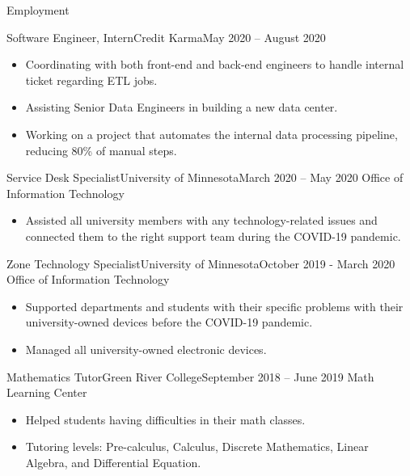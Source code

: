 \documentclass[]{mcdowellcv}
\begin{document}
	\begin{cvsection}{Employment}
		\begin{cvsubsection}{Software Engineer, Intern}{Credit Karma}{May 2020 -- August 2020}
			\begin{itemize}
			    \item Coordinating with both front-end and back-end engineers to handle internal ticket regarding ETL jobs. 
			    \item Assisting Senior Data Engineers in building a new data center.
				\item Working on a project that automates the internal data processing pipeline, reducing 80\% of manual steps.
			\end{itemize}
		\end{cvsubsection}
		
		\begin{cvsubsection}{Service Desk Specialist}{University of Minnesota}{March 2020 -- May 2020}	
		    Office of Information Technology
			\begin{itemize}
				\item Assisted all university members with any technology-related issues and connected them to the right support team during the COVID-19 pandemic.
			\end{itemize}
		\end{cvsubsection}
		
		\begin{cvsubsection}{Zone Technology Specialist}{University of Minnesota}{October 2019 - March 2020}
		    Office of Information Technology
			\begin{itemize}
				\item Supported departments and students with their specific problems with their university-owned devices before the COVID-19 pandemic.
				\item Managed all university-owned electronic devices.
			\end{itemize}
		\end{cvsubsection}
		
		\begin{cvsubsection}{Mathematics Tutor}{Green River College}{September 2018 -- June 2019}
			Math Learning Center		
			\begin{itemize}
				\item Helped students having difficulties in their math classes.
				\item Tutoring levels: Pre-calculus, Calculus, Discrete Mathematics, Linear Algebra, and Differential Equation.
			\end{itemize}
		\end{cvsubsection}
		

\end{cvsection}
\end{document}
